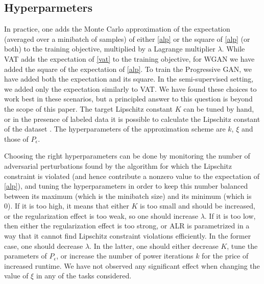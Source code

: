 \documentclass{article}
\begin{document}
\subsection{Hyperparmeters}
In practice, one adds the Monte Carlo approximation of the expectation (averaged over a minibatch of samples) of either \eqref{alp} or the square of \eqref{alp} (or both) to the training objective, multiplied by a Lagrange multiplier $\lambda$. While VAT adds the expectation of \eqref{vat} to the training objective, for WGAN we have added the square of the expectation of \eqref{alp}. To train the Progressive GAN, we have added both the expectation and its square. In the semi-supervised setting, we added only the expectation similarly to VAT. We have found these choices to work best in these scenarios, but a principled answer to this question is beyond the scope of this paper. The target Lipschitz constant $K$ can be tuned by hand, or in the presence of labeled data it is possible to calculate the Lipschitz constant of the dataset \citep{Obermanetal2018}. The hyperparameters of the approximation scheme are $k$, $\xi$ and those of $P_{\epsilon}$.

Choosing the right hyperparameters can be done by monitoring the number of adversarial perturbations found by the algorithm for which the Lipschitz constraint is violated (and hence contribute a nonzero value to the expectation of \eqref{alp}), and tuning the hyperparameters in order to keep this number balanced between its maximum (which is the minibatch size) and its minimum (which is 0). If it is too high, it means that either $K$ is too small and should be increased, or the regularization effect is too weak, so one should increase $\lambda$. If it is too low, then either the regularization effect is too strong, or ALR is parametrized in a way that it cannot find Lipschitz constraint violations efficiently. In the former case, one should decrease $\lambda$. In the latter, one should either decrease $K$, tune the parameters of $P_\epsilon$, or increase the number of power iterations $k$ for the price of increased runtime. We have not observed any significant effect when changing the value of $\xi$ in any of the tasks considered.
\end{document}
